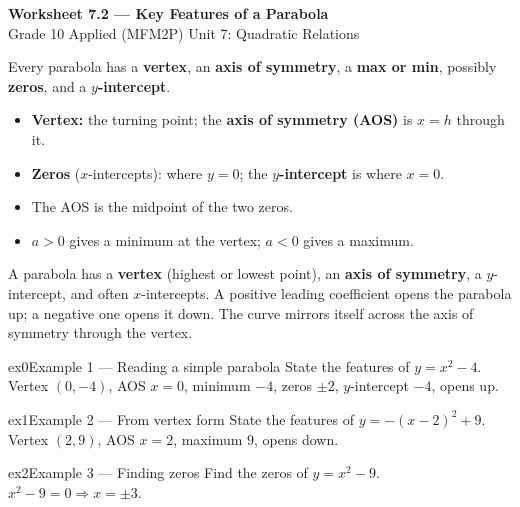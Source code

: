 \documentclass[11pt]{article}
\begin{document}
\begin{center}
{\LARGE\bfseries\color{titleblue}Worksheet 7.2 --- Key Features of a Parabola}\\[2pt]
{\small Grade 10 Applied (MFM2P) \textperiodcentered{} Unit 7: Quadratic Relations}
\end{center}

\begin{ideabox}
Every parabola has a \textbf{vertex}, an \textbf{axis of symmetry}, a \textbf{max or min}, possibly \textbf{zeros}, and a \textbf{$y$-intercept}.
\begin{itemize}[leftmargin=*,itemsep=2pt]
  \item \textbf{Vertex:} the turning point; the \textbf{axis of symmetry (AOS)} is $x=h$ through it.
  \item \textbf{Zeros} ($x$-intercepts): where $y=0$; the \textbf{$y$-intercept} is where $x=0$.
  \item The AOS is the midpoint of the two zeros.
  \item $a>0$ gives a minimum at the vertex; $a<0$ gives a maximum.
\end{itemize}
\end{ideabox}

\begin{learnbox}
A parabola has a \textbf{vertex} (highest or lowest point), an \textbf{axis of symmetry}, a $y$-intercept, and often $x$-intercepts.
A positive leading coefficient opens the parabola up; a negative one opens it down.
The curve mirrors itself across the axis of symmetry through the vertex.
\end{learnbox}


\begin{example}{ex0}{Example 1 --- Reading a simple parabola}
State the features of $y=x^2-4$.
\soln Vertex $(0,-4)$, AOS $x=0$, minimum $-4$, zeros $\pm2$, $y$-intercept $-4$, opens up.
\end{example}

\begin{example}{ex1}{Example 2 --- From vertex form}
State the features of $y=-(x-2)^2+9$.
\soln Vertex $(2,9)$, AOS $x=2$, maximum $9$, opens down.
\end{example}

\begin{example}{ex2}{Example 3 --- Finding zeros}
Find the zeros of $y=x^2-9$.
\soln $x^2-9=0\Rightarrow x=\pm3.$
\end{example}
\end{document}

